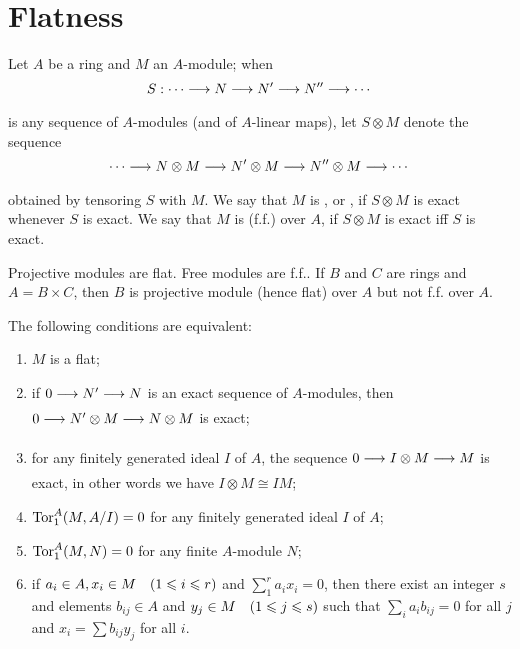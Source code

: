 \documentclass[../main]{subfiles}
\begin{document}
\section{Flatness}\label{sec:03}

\begin{pardefinition}
    Let $A$ be a ring and $M$ an $A$-module; when \[S:\cdots \varrightarrow{} N \varrightarrow{} N' \varrightarrow{} N'' \varrightarrow{} \cdots\] is any sequence of $A$-modules (and of $A$-linear maps), let $S \otimes M$ denote the sequence \[\cdots \varrightarrow{} N \otimes M \varrightarrow{} N' \otimes M \varrightarrow{} N'' \otimes M \varrightarrow{} \cdots\] obtained by tensoring $S$ with $M$. We say that $M$ is , or , if $S\otimes M$ is exact whenever $S$ is exact. We say that $M$ is  (f.f.) over $A$, if $S\otimes M$ is exact iff $S$ is exact.     
\end{pardefinition}

\begin{example} 
    Projective modules are flat. Free modules are f.f.. If $B$ and $C$ are rings and $A = B \times C$, then $B$ is projective module (hence flat) over $A$ but not f.f. over $A$.
\end{example}

\begin{theorem}\label{thm:001}
    The following conditions are equivalent:
    \begin{enumerate} [label={(\arabic*)}]
       \item $M$ is a flat;
       \item if $0 \varrightarrow{} N' \varrightarrow{} N$ is an exact sequence of $A$-modules, then \newline $0 \varrightarrow{} N' \otimes M \varrightarrow{} N \otimes M$ is exact;
       \item for any finitely generated ideal $I$ of $A$, the sequence $0 \varrightarrow{} I\otimes M \varrightarrow{} M$ is exact, in other words we have $I \otimes M \cong IM$;
       \item $\operatorname{Tor}^A_1 (M, A/ I) = 0$ for any finitely generated ideal $I$ of $A$;
       \item $\operatorname{Tor}^A_1(M,N) = 0$ for any finite $A$-module $N$;
       \item if $a_i \in A, x_i \in M\for{1 \leq i \leq r}$ and $\sum_1^r a_i x_i = 0$, then there exist an integer $s$ and elements $b_{ij} \in A$ and $y_j \in M\for{1 \leq j \leq s}$ such that $\sum_i a_i b_{ij} = 0$ for all $j$ and $x_i = \sum b_{ij}y_j$ for all $i$.
    \end{enumerate}
\end{theorem}
\end{document}
